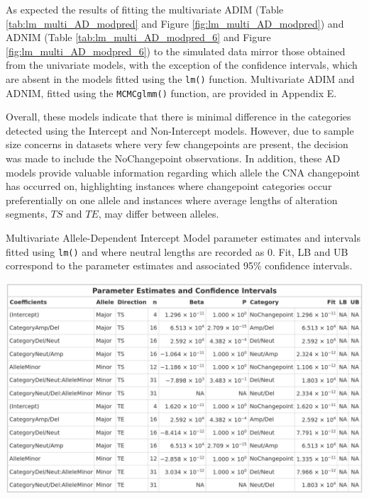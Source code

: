 As expected the results of fitting the multivariate ADIM (Table \ref{tab:lm_multi_AD_modpred} and Figure \ref{fig:lm_multi_AD_modpred}) and ADNIM (Table \ref{tab:lm_multi_AD_modpred_6} and Figure \ref{fig:lm_multi_AD_modpred_6}) to the simulated data mirror those obtained from the univariate models, with the exception of the confidence intervals, which are absent in the models fitted using the \texttt{lm()} function. Multivariate ADIM and ADNIM, fitted using the \texttt{MCMCglmm()} function, are provided in Appendix E.

Overall, these models indicate that there is minimal difference in the categories detected using the Intercept and Non-Intercept models. However, due to sample size concerns in datasets where very few changepoints are present, the decision was made to include the NoChangepoint observations. In addition, these AD models provide valuable information regarding which allele the CNA changepoint has occurred on, highlighting instances where changepoint categories occur preferentially on one allele and instances where average lengths of alteration segments, $TS$ and $TE$, may differ between alleles.

\vfill 
\begin{table}[!h]
\centering
\caption[Multivariate Allele-Dependent Intercept Model parameter parameter estimates and intervals fitted using \texttt{lm()}.]{Multivariate Allele-Dependent Intercept Model parameter estimates and intervals fitted using \texttt{lm()} and where neutral lengths are recorded as 0. Fit, LB and UB correspond to the parameter estimates and associated 95\% confidence intervals. }
      
\includegraphics[width = 1\textwidth]{../tables/Chapter_5/Multivariate_lm_7_AD_Model_Pred.png}
\label{tab:lm_multi_AD_modpred}
\end{table}
\vfill 

